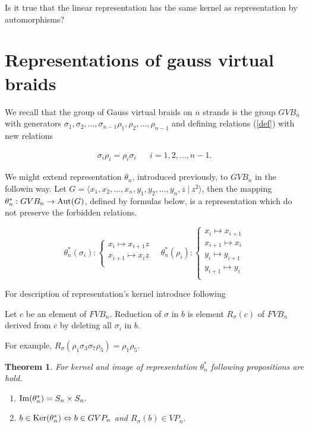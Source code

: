 \documentclass{article}
\newtheorem{theorem}{Theorem}
\begin{document}
Is it true that the linear representation has the same kernel as representation by automorphisms?

\section{Representations of gauss virtual braids}

We recall that the group of Gauss virtual braids on $n$ strands is the group $GVB_n$ with generators  $\sigma _1,\sigma _2,\dots,\sigma _{n-1}\rho_1,\rho _2,\dots,\rho _{n-1}$ and defining relations (\ref{def}) with new relations 

\begin{align*}
\sigma_i\rho_i=\rho_i\sigma_i && i = 1, 2, \dots,n-1.
\end{align*}

We might extend representation $\theta_n$, introduced previously, to $GVB_n$ in the followin way. Let $G=\langle x_1, x_2, \ldots, x_n, y_1, y_2, \ldots, y_n, z ~|~ z^2\rangle$, then the mapping $\theta_n^*:GVB_n\to {\rm Aut}(G)$, defined by formulas below, is a representation which do not preserve the forbidden relations. 

\begin{equation}\label{defGV}
\theta_n^*(\sigma_i):
\begin{cases}
x_i \mapsto x_{i+1}z\\
x_{i+1} \mapsto x_iz\\
\end{cases}\quad
\theta_n^*(\rho_i):
\begin{cases}
x_i \mapsto x_{i+1}\\
x_{i+1} \mapsto x_i\\
y_i \mapsto y_{i+1}\\
y_{i+1} \mapsto y_i\\
\end{cases}
\end{equation}

For description of representation's kernel introduce following

\begin{definition}
Let $c$ be an element of $FVB_n$. Reduction of $\sigma$ in $b$ is element $R_{\sigma}(c)$ of $FVB_n$ derived from $c$ by deleting all $\sigma_i$ in $b$.
\end{definition}

For example, $R_{\sigma}(\rho_1\sigma_3\sigma_7\rho_5)=\rho_1\rho_5$. 

\begin{theorem}
For kernel and image of representation $\theta_n^*$ following propositions are hold.
\begin{enumerate}
\item ${\rm Im}(\theta_n^*)=S_n\times S_n.$
\item $b\in {\rm Ker}(\theta_n^*) \Leftrightarrow b\in GVP_n$ and $R_{\sigma}(b)\in VP_n.$
\end{enumerate}
\end{theorem}
\end{document}
